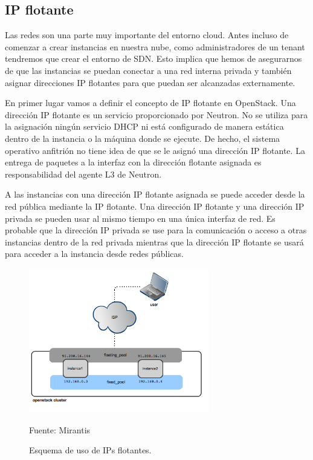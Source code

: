 \subsection{IP flotante} \label{subsec:IP-flotante}
Las redes son una parte muy importante del entorno cloud. Antes incluso de comenzar a crear instancias en nuestra nube, como administradores de un tenant tendremos que crear el entorno de SDN. Esto implica que hemos de asegurarnos de que las instancias se puedan conectar a una red interna privada y también asignar direcciones IP flotantes para que puedan ser alcanzadas externamente.

En primer lugar vamos a definir el concepto de IP flotante en OpenStack. Una dirección IP flotante es un servicio proporcionado por Neutron. No se utiliza para la asignación ningún servicio DHCP ni está configurado de manera estática  dentro de la instancia o la máquina donde se ejecute. De hecho, el sistema operativo anfitrión no tiene idea de que se le asignó una dirección IP flotante. La entrega de paquetes a la interfaz con la dirección flotante asignada es responsabilidad del agente L3 de Neutron. 

A las instancias con una dirección IP flotante asignada se puede acceder desde la red pública mediante la IP flotante.
Una dirección IP flotante y una dirección IP privada se pueden usar al mismo tiempo en una única interfaz de red. Es probable que la dirección IP privada se use para la comunicación o acceso a otras instancias dentro de la red privada mientras que la dirección IP flotante se usará para acceder a la instancia desde redes públicas.

\begin{figure}
    \centering
    \includegraphics[width=0.7\textwidth]{imagenes/capitulo6/floatingIP.png}
    \caption{Esquema de uso de IPs flotantes.}
	\vspace{0.3cm}
    \footnotesize{Fuente: Mirantis }
    \label{ipsflotantes}
\end{figure}

